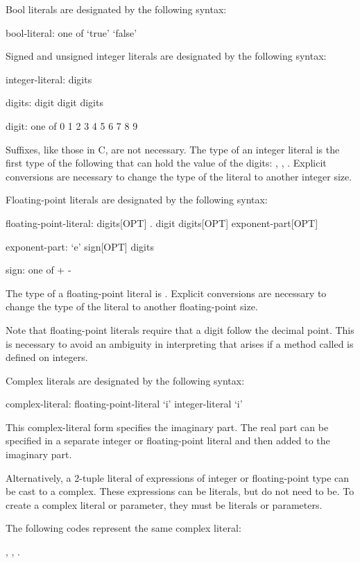 Bool literals are designated by the following syntax:
\begin{syntax}
bool-literal: one of
  `true' `false'
\end{syntax}

Signed and unsigned integer literals are designated by the following
syntax:
\begin{syntax}
integer-literal:
  digits

digits:
  digit
  digit digits

digit: one of
  0 1 2 3 4 5 6 7 8 9
\end{syntax}
Suffixes, like those in C, are not necessary.  The type of an integer
literal is the first type of the following that can hold the value of
the digits: , , .  Explicit
conversions are necessary to change the type of the literal to another
integer size.

Floating-point literals are designated by the following syntax:
\begin{syntax}
floating-point-literal:
  digits[OPT] . digit digits[OPT] exponent-part[OPT]

exponent-part:
  `e' sign[OPT] digits

sign: one of
  + -
\end{syntax}
The type of a floating-point literal is .  Explicit
conversions are necessary to change the type of the literal to another
floating-point size.

Note that floating-point literals require that a digit follow the
decimal point.  This is necessary to avoid an ambiguity in
interpreting  that arises if a method called  is
defined on integers.

Complex literals are designated by the following syntax:
\begin{syntax}
complex-literal:
  floating-point-literal `i'
  integer-literal `i'
\end{syntax}
This complex-literal form specifies the imaginary part.  The real part
can be specified in a separate integer or floating-point literal and
then added to the imaginary part.

Alternatively, a 2-tuple literal of expressions of integer or
floating-point type can be cast to a complex.  These expressions can
be literals, but do not need to be.  To create a complex literal or
parameter, they must be literals or parameters.

\begin{example}
The following codes represent the same complex literal:
\begin{center}
, \hspace{1pc} , \hspace{1pc}
.
\end{center}
\end{example}

